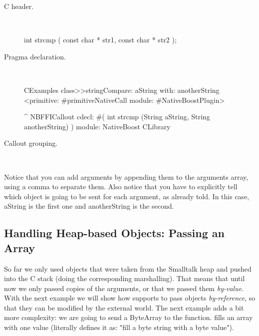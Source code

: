\documentclass[a4paper,10pt,twoside]{book}
\begin{document}
\begin{description}
\item [C header.] \ 

\begin{code}{}
int strcmp ( const char * str1, const char * str2 );
\end{code}

\item [Pragma declaration.] \ 

\begin{code}{}
CExamples class>>stringCompare: aString with: anotherString
	<primitive: #primitiveNativeCall module: #NativeBoostPlugin>
	
	^ NBFFICallout cdecl: #( int strcmp (String aString, String anotherString) ) module: NativeBoost CLibrary
\end{code}


\item [Callout grouping.] \ 
 

\end{description}

Notice that you can add arguments by appending them to the arguments array,
using a comma to separate them. Also notice that you have to explicitly tell
which object is going to be sent for each argument, as already told. In this
case, aString is the first one and anotherString is the second.



\subsection{Handling Heap-based Objects: Passing an Array}
So far we only used objects that were taken from the Smalltalk heap and pushed into the C stack (doing the corresponding marshalling). 
That means that until now we only passed copies of the arguments, or that we passed them \emph{by-value}. With the next example we will show how \Spock supports to pass objects \emph{by-reference}, so that they can be modified by the external world.
The next example adds a bit more complexity: we are going to send a ByteArray
to the  function.  fills an array with one value (literally  defines it as: "fill a byte string with a byte value").
\end{document}
